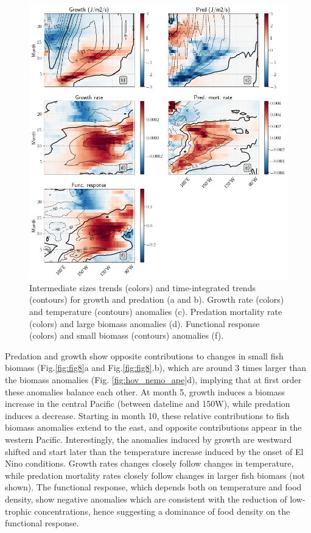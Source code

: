 \begin{figure}[h!tp]
	\centering
	\includegraphics[scale=0.4]{figs/fig9.png}	
	\caption{Intermediate sizes trends (colors) and time-integrated trends (contours) for growth and predation (a and b). Growth rate (colors) and temperature (contours) anomalies (c). Predation mortality rate (colors) and large biomass anomalies (d). Functional response (colors) and small biomass (contours) anomalies (f).}	
	\label{fig:fig9}
\end{figure}

Predation and growth show opposite contributions to changes in small fish biomass (Fig.\ref{fig:fig8}a and Fig.\ref{fig:fig8}.b), which are around 3 times larger than the biomass anomalies (Fig. \ref{fig:hov_nemo_ape}d), implying that at first order these anomalies balance each other. At month 5, growth induces a biomass increase in the central Pacific (between dateline and 150\degree{}W), while predation induces a decrease. Starting in month 10, these relative contributions to fish biomass anomalies extend to the east, and opposite contributions appear in the western Pacific. Interestingly, the anomalies induced by growth are westward shifted and start later than the temperature increase induced by the onset of El Nino conditions. Growth rates changes closely follow changes in temperature, while predation mortality rates closely follow changes in larger fish biomass (not shown). The functional response, which depends both on temperature and food density, show negative anomalies which are consistent with the reduction of low-trophic concentrations, hence suggesting a dominance of food density on the functional response.

